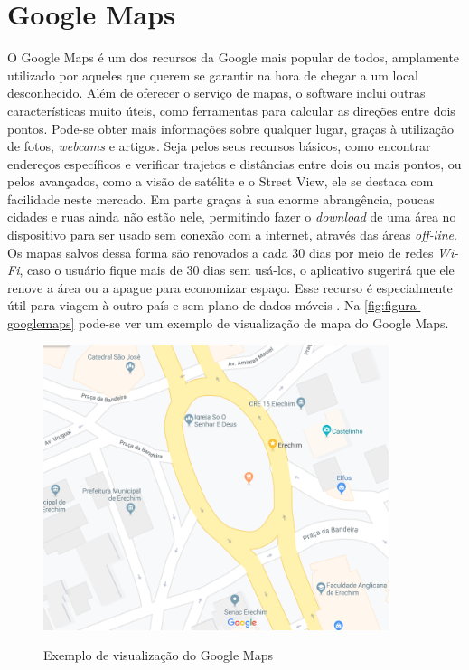 \section{Google Maps}
O Google Maps é um dos recursos da Google mais popular de todos, amplamente utilizado por aqueles que querem se garantir na hora de chegar a um local desconhecido. Além de oferecer o serviço de mapas, o software inclui outras características muito úteis, como ferramentas para calcular as direções entre dois pontos. Pode-se obter mais informações sobre qualquer lugar, graças à utilização de fotos, \textit{webcams} e artigos. Seja pelos seus recursos básicos, como encontrar endereços específicos e verificar trajetos e distâncias entre dois ou mais pontos, ou pelos avançados, como a visão de satélite e o Street View, ele se destaca com facilidade neste mercado. Em parte graças à sua enorme abrangência, poucas cidades e ruas ainda não estão nele, permitindo fazer o \textit{download} de uma área no dispositivo para ser usado sem conexão com a internet, através das áreas \textit{off-line}. Os mapas salvos dessa forma são renovados a cada 30 dias por meio de redes \textit{Wi-Fi}, caso o usuário fique mais de 30 dias sem usá-los, o aplicativo sugerirá que ele renove a área ou a apague para economizar espaço. Esse recurso é especialmente útil para viagem à outro país e sem plano de dados móveis \cite{google:2019}. Na \autoref{fig:figura-googlemaps} pode-se ver um exemplo de visualização de mapa do Google Maps.

\begin{figure}[H]
    \centering
    \caption{Exemplo de visualização do Google Maps}
    \includegraphics[width=0.9\textwidth]{./dados/figuras/fig4}
    \label{fig:figura-googlemaps}
\end{figure}


